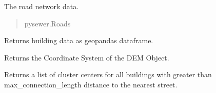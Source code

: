 \documentclass[letterpaper,10pt,english]{sphinxmanual}
\begin{document}
\begin{fulllineitems}
\begin{fulllineitems}
\end{fulllineitems}


\begin{fulllineitems}
\label{\detokenize{pysewer:pysewer.preprocessing.Buildings.roads_obj}}
\pysigstartsignatures
{}
\pysigstopsignatures
\sphinxAtStartPar
The road network data.
\begin{quote}\begin{description}
\sphinxAtStartPar
pysewer.Roads

\end{description}\end{quote}

\end{fulllineitems}



\begin{fulllineitems}

\pysigstartsignatures
{}
\pysigstopsignatures
\sphinxAtStartPar
Returns building data as geopandas dataframe.

\end{fulllineitems}



\begin{fulllineitems}

\pysigstartsignatures
{}
\pysigstopsignatures
\sphinxAtStartPar
Returns the Coordinate System of the DEM Object.

\end{fulllineitems}



\begin{fulllineitems}

\pysigstartsignatures
{}
\pysigstopsignatures
\sphinxAtStartPar
Returns a list of cluster centers for all buildings with greater than max\_connection\_length distance to the nearest street.

\end{fulllineitems}



\end{fulllineitems}
\end{document}
